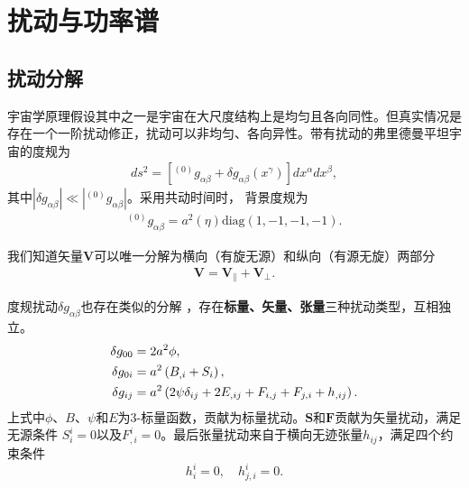 \section{扰动与功率谱}
% 

\subsection{扰动分解}
宇宙学原理假设其中之一是宇宙在大尺度结构上是均匀且各向同性。但真实情况是存在一个一阶扰动修正，扰动可以非均匀、各向异性。带有扰动的弗里德曼平坦宇宙的度规为
\begin{align}
	\label{eq:perturbation-metric}
	ds^2=\left[^{(0)}g_{\alpha\beta}+\delta g_{\alpha\beta}(x^{\gamma})
	\right]dx^{\alpha}dx^{\beta},
\end{align}
其中$|\delta g_{\alpha\beta}|\ll|^{(0)}g_{\alpha\beta}|$。采用共动时间时，
背景度规为
\begin{align}
	\label{eq:background-metric}
	^{(0)}g_{\alpha\beta}=a^2(\eta)\text{diag}(1, -1, -1, -1).
\end{align}

我们知道矢量$\bm{V}$可以唯一分解为横向（有旋无源）和纵向（有源无旋）两部分
\begin{align}
  \label{eq:composition-of-vector}
  \bm{V}=\bm{V}_{\parallel}+\bm{V}_{\bot}.
\end{align}

度规扰动$\delta
g_{\alpha\beta}$也存在类似的分解\citep{york1974covariant,deser1967covariant}
，存在\textbf{标量、矢量、张量}三种扰动类型，互相独立。
\begin{equation}
  \begin{aligned}
  \label{eq:decomposition-of-metric}
  \delta g_{00} &= 2a^2\phi, \\
  \delta g_{0i} &= a^2\left(B_{,i}+S_{i}\right), \\
  \delta g_{ij}&= a^2
  \left(2\psi \delta_{ij}+2E_{,ij}+F_{i,j}+F_{j,i}+h_{,ij}\right).
  \end{aligned}
\end{equation}
上式中$\phi$、$B$、$\psi$和$E$为3-标量函数，贡献为标量扰动。$\bm{S}$和$\bm{F}$贡献为矢量扰动，满足无源条件
$S^{i}_{i}=0$以及$F^{i}_{,i}=0$。最后张量扰动来自于横向无迹张量$h_{ij}$，满足四个约束条件
\begin{equation}
  \label{eq:traceless-transerse-tensor-perturbation}
  h^{i}_{i}=0,\quad h^{i}_{j,i}=0.
\end{equation}

